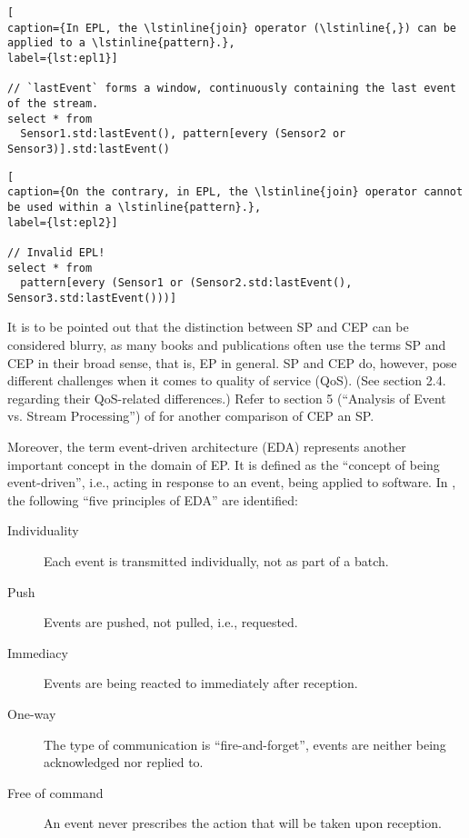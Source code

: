 \documentclass[article, type=bsc, colorback, accentcolor=tud8b, parskip=half, bibliography=totocnumbered]{tudthesis}
\begin{document}
\begin{lstlisting}[
caption={In EPL, the \lstinline{join} operator (\lstinline{,}) can be applied to a \lstinline{pattern}.},
label={lst:epl1}]

// `lastEvent` forms a window, continuously containing the last event of the stream.
select * from
  Sensor1.std:lastEvent(), pattern[every (Sensor2 or Sensor3)].std:lastEvent()

\end{lstlisting}

\begin{lstlisting}[
caption={On the contrary, in EPL, the \lstinline{join} operator cannot be used within a \lstinline{pattern}.},
label={lst:epl2}]

// Invalid EPL!
select * from
  pattern[every (Sensor1 or (Sensor2.std:lastEvent(), Sensor3.std:lastEvent()))]

\end{lstlisting}

It is to be pointed out that the distinction between SP and CEP can be considered blurry, as many books and publications often use the terms SP and CEP in their broad sense, that is, EP in general.
SP and CEP do, however, pose different challenges when it comes to quality of service (QoS).
(See section 2.4. regarding their QoS-related differences.)
Refer to section 5 (``Analysis of Event vs. Stream Processing'') of \cite{Chakravarthy:2008:ESH:1385989.1385991} for another comparison of CEP an SP.

Moreover, the term event-driven architecture (EDA) represents another important concept in the domain of EP.
It is defined as the ``concept of being event-driven'', i.e., acting in response to an event, being applied to software.
In \cite{Chandy:2009:EPD:1594754}, the following ``five principles of EDA'' are identified:

\begin{description}

\item[Individuality]
Each event is transmitted individually, not as part of a batch.
\item[Push]
Events are pushed, not pulled, i.e., requested.
\item[Immediacy]
Events are being reacted to immediately after reception.
\item[One-way]
The type of communication is ``fire-and-forget'', events are neither being acknowledged nor replied to.
\item[Free of command]
An event never prescribes the action that will be taken upon reception.

\end{description}
\end{document}
